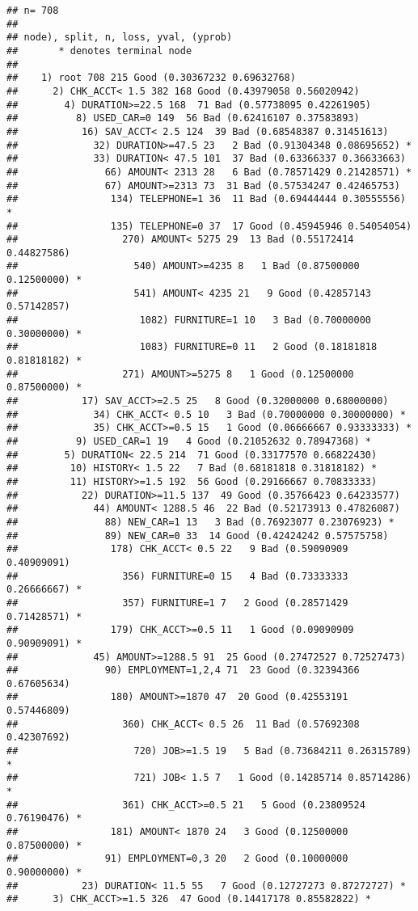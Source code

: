 \documentclass[
]{article}
\begin{document}
\begin{verbatim}
## n= 708 
## 
## node), split, n, loss, yval, (yprob)
##       * denotes terminal node
## 
##    1) root 708 215 Good (0.30367232 0.69632768)  
##      2) CHK_ACCT< 1.5 382 168 Good (0.43979058 0.56020942)  
##        4) DURATION>=22.5 168  71 Bad (0.57738095 0.42261905)  
##          8) USED_CAR=0 149  56 Bad (0.62416107 0.37583893)  
##           16) SAV_ACCT< 2.5 124  39 Bad (0.68548387 0.31451613)  
##             32) DURATION>=47.5 23   2 Bad (0.91304348 0.08695652) *
##             33) DURATION< 47.5 101  37 Bad (0.63366337 0.36633663)  
##               66) AMOUNT< 2313 28   6 Bad (0.78571429 0.21428571) *
##               67) AMOUNT>=2313 73  31 Bad (0.57534247 0.42465753)  
##                134) TELEPHONE=1 36  11 Bad (0.69444444 0.30555556) *
##                135) TELEPHONE=0 37  17 Good (0.45945946 0.54054054)  
##                  270) AMOUNT< 5275 29  13 Bad (0.55172414 0.44827586)  
##                    540) AMOUNT>=4235 8   1 Bad (0.87500000 0.12500000) *
##                    541) AMOUNT< 4235 21   9 Good (0.42857143 0.57142857)  
##                     1082) FURNITURE=1 10   3 Bad (0.70000000 0.30000000) *
##                     1083) FURNITURE=0 11   2 Good (0.18181818 0.81818182) *
##                  271) AMOUNT>=5275 8   1 Good (0.12500000 0.87500000) *
##           17) SAV_ACCT>=2.5 25   8 Good (0.32000000 0.68000000)  
##             34) CHK_ACCT< 0.5 10   3 Bad (0.70000000 0.30000000) *
##             35) CHK_ACCT>=0.5 15   1 Good (0.06666667 0.93333333) *
##          9) USED_CAR=1 19   4 Good (0.21052632 0.78947368) *
##        5) DURATION< 22.5 214  71 Good (0.33177570 0.66822430)  
##         10) HISTORY< 1.5 22   7 Bad (0.68181818 0.31818182) *
##         11) HISTORY>=1.5 192  56 Good (0.29166667 0.70833333)  
##           22) DURATION>=11.5 137  49 Good (0.35766423 0.64233577)  
##             44) AMOUNT< 1288.5 46  22 Bad (0.52173913 0.47826087)  
##               88) NEW_CAR=1 13   3 Bad (0.76923077 0.23076923) *
##               89) NEW_CAR=0 33  14 Good (0.42424242 0.57575758)  
##                178) CHK_ACCT< 0.5 22   9 Bad (0.59090909 0.40909091)  
##                  356) FURNITURE=0 15   4 Bad (0.73333333 0.26666667) *
##                  357) FURNITURE=1 7   2 Good (0.28571429 0.71428571) *
##                179) CHK_ACCT>=0.5 11   1 Good (0.09090909 0.90909091) *
##             45) AMOUNT>=1288.5 91  25 Good (0.27472527 0.72527473)  
##               90) EMPLOYMENT=1,2,4 71  23 Good (0.32394366 0.67605634)  
##                180) AMOUNT>=1870 47  20 Good (0.42553191 0.57446809)  
##                  360) CHK_ACCT< 0.5 26  11 Bad (0.57692308 0.42307692)  
##                    720) JOB>=1.5 19   5 Bad (0.73684211 0.26315789) *
##                    721) JOB< 1.5 7   1 Good (0.14285714 0.85714286) *
##                  361) CHK_ACCT>=0.5 21   5 Good (0.23809524 0.76190476) *
##                181) AMOUNT< 1870 24   3 Good (0.12500000 0.87500000) *
##               91) EMPLOYMENT=0,3 20   2 Good (0.10000000 0.90000000) *
##           23) DURATION< 11.5 55   7 Good (0.12727273 0.87272727) *
##      3) CHK_ACCT>=1.5 326  47 Good (0.14417178 0.85582822) *
\end{verbatim}
\end{document}
